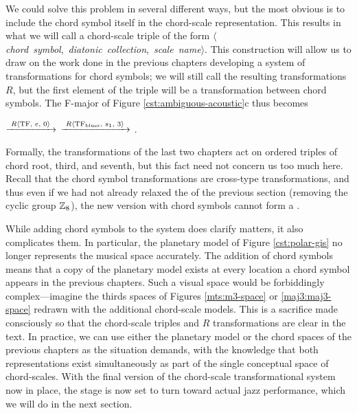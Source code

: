 We could solve this problem in several different ways, but the most obvious is
to include the chord symbol itself in the chord-scale representation. This
results in what we will call a chord-scale triple of the form
\mbox{$\langle$\emph{chord symbol}, \emph{diatonic collection}, \emph{scale
    name}$\rangle$}. This construction will allow us to draw on the work done
in the previous chapters developing a system of transformations for chord
symbols; we will still call the resulting transformations $R$, but the first
element of the triple will be a transformation between chord
symbols. The F-major \tfo of Figure \ref{cst:ambiguous-acoustic}c
thus becomes \\
{ \centering {}
  $\xrightarrow{\text{ \mbox{\ensuremath{R\langle}TF, $e$, $0$\ensuremath{\rangle}} }}$ 
  $\xrightarrow{\text{ \mbox{\ensuremath{R\langle}TF\textsubscript{blues}, $s_1$, $3$\ensuremath{\rangle}} }}$
  .
  \par
}
\noindent Formally, the transformations of the last two chapters act on
ordered triples of chord root, third, and seventh, but this fact need not
concern us too much here. Recall that the chord symbol transformations are
cross-type transformations, and thus even if we had not already relaxed the
\gis of the previous section (removing the cyclic group $\mathbb{Z}_8$), the new
version with chord symbols cannot form a \gis.

While adding chord symbols to the system does clarify matters, it also
complicates them. In particular, the planetary model of Figure
\ref{cst:polar-gis} no longer represents the musical space accurately. The
addition of chord symbols means that a copy of the planetary model exists at
every location a chord symbol appears in the previous chapters.
Such a visual space would be forbiddingly complex---imagine the thirds spaces
of Figures \ref{mts:m3-space} or \ref{maj3:maj3-space} redrawn with the
additional chord-scale models. This is a sacrifice made consciously so that
the chord-scale triples and $R$ transformations are clear in the text. In
practice, we can use either the planetary model or the chord spaces of the
previous chapters as the situation demands, with the knowledge that both
representations exist simultaneously as part of the single conceptual space of
chord-scales. With the final version of the chord-scale transformational
system now in place, the stage is now set to turn toward actual jazz performance,
which we will do in the next section.


